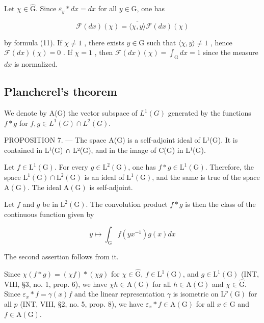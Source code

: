 Let \(\chi \in \widehat{\mathrm{G}}\). Since \(\varepsilon_y * dx = dx\) for all \(y \in \mathrm{G}\), one has

\[
\mathcal {F} (d x) (\chi) = \overline {{\langle \chi , y \rangle}} \mathcal {F} (d x) (\chi)
\]

by formula (11). If \(\chi \neq 1\) , there exists \(y \in \mathrm{G}\) such that \(\langle \chi, y \rangle \neq 1\) , hence \(\mathcal{F}(dx)(\chi) = 0\) . If \(\chi = 1\) , then \(\mathcal{F}(dx)(\chi) = \int_{\mathrm{G}} dx = 1\) since the measure \(dx\) is normalized.

\subsection{Plancherel's theorem}

We denote by A(G) the vector subspace of \(L^{1}(G)\) generated by the functions \(f * g\) for \(f, g \in L^{1}(G) \cap L^{2}(G)\).

PROPOSITION 7. --- The space A(G) is a self-adjoint ideal of L¹(G). It is contained in L¹(G) ∩ L²(G), and in the image of C(G) in L¹(G).

Let \(f \in \mathrm{L}^1(\mathrm{G})\). For every \(g \in \mathrm{L}^2(\mathrm{G})\), one has \(f * g \in \mathrm{L}^1(\mathrm{G})\). Therefore, the space \(\mathrm{L}^1(\mathrm{G}) \cap \mathrm{L}^2(\mathrm{G})\) is an ideal of \(\mathrm{L}^1(\mathrm{G})\), and the same is true of the space \(\mathrm{A}(\mathrm{G})\). The ideal \(\mathrm{A}(\mathrm{G})\) is self-adjoint.

Let \(f\) and \(g\) be in \(\mathrm{L}^2(\mathrm{G})\). The convolution product \(f * g\) is then the class of the continuous function given by

\[
y \mapsto \int_ {\mathrm{G}} f (y x ^ {- 1}) g (x) d x
\]

The second assertion follows from it.

Since \(\chi(f*g) = (\chi f)*( \chi g)\) for \(\chi \in \widehat{\mathrm{G}}\), \(f \in \mathrm{L}^1(\mathrm{G})\), and \(g \in \mathrm{L}^1(\mathrm{G})\) (INT, VIII, §3, no. 1, prop. 6), we have \(\chi h \in \mathrm{A}(\mathrm{G})\) for all \(h \in \mathrm{A}(\mathrm{G})\) and \(\chi \in \widehat{\mathrm{G}}\). Since \(\varepsilon_x * f = \gamma(x)f\) and the linear representation \(\gamma\) is isometric on \(\mathrm{L}^p(\mathrm{G})\) for all \(p\) (INT, VIII, §2, no. 5, prop. 8), we have \(\varepsilon_x * f \in \mathrm{A}(\mathrm{G})\) for all \(x \in \mathrm{G}\) and \(f \in \mathrm{A}(\mathrm{G})\).

